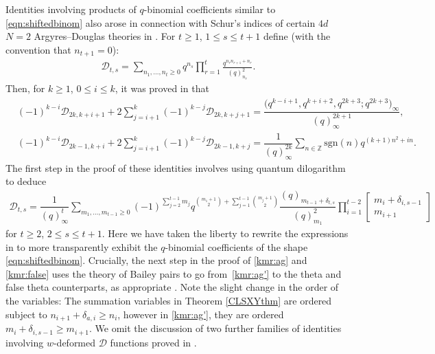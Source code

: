 \documentclass[pdftex]{sigma}
\numberwithin{equation}{section}
\begin{document}
Identities involving products of $q$-binomial coefficients similar to \eqref{eqn:shiftedbinom} also arose in connection with Schur's indices of certain $4d$ $N=2$ Argyres--Douglas theories in \cite{KMR}. For $t\geq 1$, $1\leq s\leq t+1$ define (with the convention that $n_{t+1}=0$):
\begin{align*}
\mathscr{D}_{t,s}=
\sum_{n_1,\dots, n_t\geq 0}
q^{n_s}\prod_{r=1}^{t}\frac{q^{n_r n_{r+1} + n_r} }{(q)_{n_r}^2}.
\end{align*}
Then, for $k\geq 1$, $0\leq i\leq k$, it was proved in \cite[Theorems~6.1 and~7.1]{KMR} that
\begin{align}
&(-1)^{k-i}\mathscr{D}_{2k,k+i+1}
+2\sum_{j=i+1}^{k}(-1)^{k-j}\mathscr{D}_{2k,k+j+1}
= \dfrac{\bigl(q^{k-i+1},q^{k+i+2},q^{2k+3}; q^{2k+3}\bigr)_{\infty}}{(q)_\infty^{2k+1}},\label{kmr:ag}\\
&(-1)^{k-i}\mathscr{D}_{2k-1,k+i}
+2\sum_{j=i+1}^{k}(-1)^{k-j}\mathscr{D}_{2k-1,k+j}
= \dfrac{1}{(q)_{\infty}^{2k}}\sum_{n\in\mathbb{Z}}\mathrm{sgn}(n)q^{(k+1)n^2+in}
\label{kmr:false}.
\end{align}
The first step in the proof of these identities involves using quantum dilogarithm to deduce
\begin{gather}
\mathscr{D}_{t,s}
=\dfrac{1}{(q)_{\infty}^t}
\sum_{m_1,\dots,m_{t-1}\geq 0}
(-1)^{\sum_{j=2}^{t-1}m_j}q^{\binom{m_1+1}{2}+ \sum_{j=1}^{t-1}\binom{m_j+1}{2}}
\dfrac{(q)_{m_{t-1} + \delta_{t,s}}}{(q)_{m_1}^2}
\prod_{i=1}^{t-2}
\begin{bmatrix}
	m_{i} + \delta_{i,s-1} \\
	m_{i+1}
\end{bmatrix}\!\!\!\!
\label{kmr:ag'}
\end{gather}
for $t\geq 2$, $2\leq s\leq t+1$. Here we have taken the liberty to rewrite the expressions in \cite[Propo\-si\-tion~4.2]{KMR} to more transparently exhibit the $q$-binomial coefficients of the shape \eqref{eqn:shiftedbinom}.
Crucially, the next step in the proof of \eqref{kmr:ag} and \eqref{kmr:false} uses the theory of Bailey pairs to go from~\eqref{kmr:ag'} to the theta and false theta counterparts, as appropriate \cite[Section~5]{KMR}.
Note the slight change in the order of the variables:
The summation variables in Theorem \ref{CLSXYthm} are ordered subject to $n_{i+1}+\delta_{a,i}\geq n_i$, however in \eqref{kmr:ag'}, they are ordered $m_i+\delta_{i,s-1}\geq m_{i+1}$. We omit the discussion of two further families of identities involving $w$-deformed $\mathscr{D}$ functions proved in \cite{KMR}.
\end{document}

